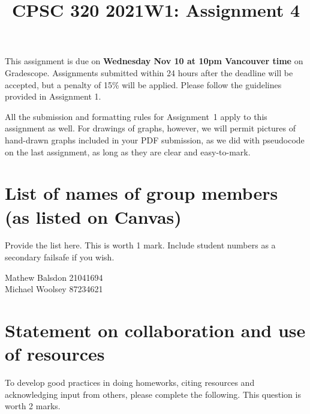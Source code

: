 \documentclass[11pt]{article}
\author{}
\date{}
\begin{document}
\title{CPSC 320 2021W1: Assignment 4}

\maketitle
\vspace{-0.5in}

This assignment is due on \textbf{Wednesday Nov 10 at 10pm Vancouver time} on Gradescope. Assignments submitted within 24 hours after the deadline will be accepted, but a penalty of 15\% will be applied. Please follow the guidelines provided in Assignment 1.

All the submission and formatting rules for Assignment~1 apply to
this assignment as well.  For drawings of graphs, however, we will permit
pictures of hand-drawn graphs included in your PDF submission, as we did
with pseudocode on the last assignment, as long as they are clear and
easy-to-mark.

\section{List of names of group members (as listed on Canvas)}

Provide the list here. This is worth 1 mark. Include student numbers
as a secondary failsafe if you wish.

\begin{soln}
Mathew Balsdon 21041694 \\
Michael Woolsey 87234621
\end{soln}

\section{Statement on collaboration and use of resources}
To develop good practices in doing homeworks,
citing resources and acknowledging input from others, please complete the following.
This question is worth 2 marks.
\end{document}
